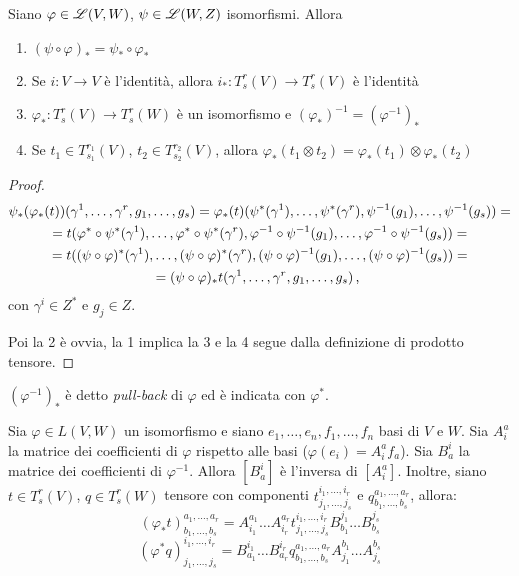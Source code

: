 \begin{proposition}
	Siano $\varphi\in \mathscr L(V,W)$, $\psi\in \mathscr L(W,Z)$ isomorfismi. Allora
	\begin{enumerate}
	 \item $(\psi\circ\varphi)_* = \psi_*\circ \varphi_*$
	 \item Se $i:V\to V$ è l'identità, allora $i_*:T_s^r(V) \to T_s^r(V)$ è l'identità
	 \item $\varphi_*:T_s^r(V) \to T_s^r(W)$ è un isomorfismo e $(\varphi_*)^{-1} = (\varphi^{-1})_*$
	 \item Se $t_1\in T_{s_1}^{r_1}(V)$, $t_2\in T_{s_2}^{r_2}(V)$, allora $\varphi_*(t_1\otimes t_2) = \varphi_*(t_1)\otimes \varphi_*(t_2)$
	\end{enumerate}
\end{proposition}
\begin{proof}
	\begin{multline*}
		\psi_*(\varphi_*(t)) (\gamma^1,\dots,\gamma^r,g_1,\dots,g_s) = \varphi_*(t) (\psi^*(\gamma^1),\dots,\psi^*(\gamma^r), \psi^{-1}(g_1),\dots, \psi^{-1}(g_s)) =\\
		= t(\varphi^*\circ \psi^*(\gamma^1),\dots, \varphi^*\circ \psi^*(\gamma^r), \varphi^{-1}\circ \psi^{-1}(g_1), \dots, \varphi^{-1}\circ \psi^{-1}(g_s) ) =\\
		= t((\psi\circ\varphi)^*(\gamma^1),\dots, (\psi\circ\varphi)^*(\gamma^r), (\psi\circ\varphi)^{-1}(g_1), \dots, (\psi\circ\varphi)^{-1}(g_s) ) = \\
		= (\psi\circ\varphi)_* t (\gamma^1,\dots,\gamma^r,g_1,\dots,g_s)\, \text{, }
	\end{multline*}
	con $\gamma^i\in Z^*$ e $g_j\in Z$.
	
	Poi la 2 è ovvia, la 1 implica la 3 e la 4 segue dalla definizione di prodotto tensore.

\end{proof}

\begin{definition}
	$(\varphi^{-1})_*$ è detto \emph{pull-back} di $\varphi$ ed è indicata con $\varphi^*$.
\end{definition}

\begin{proposition}
	Sia $\varphi\in L(V,W)$ un isomorfismo e siano $e_1,\dots,e_n,f_1,\dots,f_n$ basi di $V$ e $W$.
	Sia $A_i^a$ la matrice dei coefficienti di $\varphi$ rispetto alle basi ($\varphi(e_i) = A_i^af_a$).
	Sia $B_a^i$ la matrice dei coefficienti di $\varphi^{-1}$.
	Allora $[B_a^i]$ è l'inversa di $[A_i^a]$. Inoltre, siano $t\in T_s^r(V)$, $q\in T_s^r(W)$ tensore con componenti $t_{j_1,\dots,j_s}^{i_1,\dots,i_r}$ e $q_{b_1,\dots,b_s}^{a_1,\dots,a_r}$, allora:
	\begin{equation*} 
		(\varphi_*t)_{b_1,\dots,b_s}^{a_1,\dots,a_r} = A_{i_1}^{a_1}\dots A_{i_r}^{a_r} t_{j_1,\dots,j_s}^{i_1,\dots,i_r} B_{b_1}^{j_1}\dots B_{b_s}^{j_s}
	\end{equation*}
	\begin{equation*}
		(\varphi^*q)_{j_1,\dots,j_s}^{i_1,\dots,i_r} =B_{a_1}^{i_1}\dots B_{a_r}^{i_r} q_{b_1,\dots,b_s}^{a_1,\dots,a_r} A_{j_1}^{b_1}\dots A_{j_s}^{b_s}
	\end{equation*}
\end{proposition}

